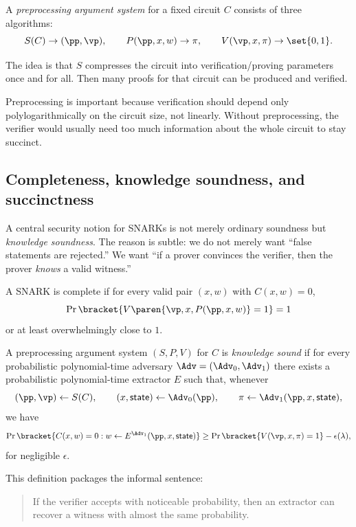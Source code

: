 A \emph{preprocessing argument system} for a fixed circuit $C$ consists of three algorithms:
\[
S(C) \to (\pp,\vp),\qquad P(\pp,x,w) \to \pi,\qquad V(\vp,x,\pi)\to\set{0,1}.
\]

The idea is that $S$ compresses the circuit into verification/proving parameters once and for all. Then many proofs for that circuit can be produced and verified.

Preprocessing is important because verification should depend only polylogarithmically on the circuit size, not linearly. Without preprocessing, the verifier would usually need too much information about the whole circuit to stay succinct.

\subsection{Completeness, knowledge soundness, and succinctness}

A central security notion for SNARKs is not merely ordinary soundness but \emph{knowledge soundness}. The reason is subtle: we do not merely want ``false statements are rejected.'' We want ``if a prover convinces the verifier, then the prover \emph{knows} a valid witness.''

\begin{definition}[Completeness]
A SNARK is complete if for every valid pair $(x,w)$ with $C(x,w)=0$,
\[
\Pr\bracket{V\paren{\vp,x,P(\pp,x,w)}=1}=1
\]
or at least overwhelmingly close to $1$.
\end{definition}

\begin{definition}
A preprocessing argument system $(S,P,V)$ for $C$ is \emph{knowledge sound} if for every probabilistic polynomial-time adversary $\Adv=(\Adv_0,\Adv_1)$ there exists a probabilistic polynomial-time extractor $E$ such that, whenever
\[
(\pp,\vp)\leftarrow S(C),\qquad (x,\mathsf{state})\leftarrow \Adv_0(\pp),\qquad \pi\leftarrow \Adv_1(\pp,x,\mathsf{state}),
\]
we have
\[
\Pr\bracket{C(x,w)=0: w\leftarrow E^{\Adv_1}(\pp,x,\mathsf{state})}
\ge
\Pr\bracket{V(\vp,x,\pi)=1}-\epsilon(\lambda),
\]
for negligible $\epsilon$.
\end{definition}

This definition packages the informal sentence:
\begin{quote}
If the verifier accepts with noticeable probability, then an extractor can recover a witness with almost the same probability.
\end{quote}

